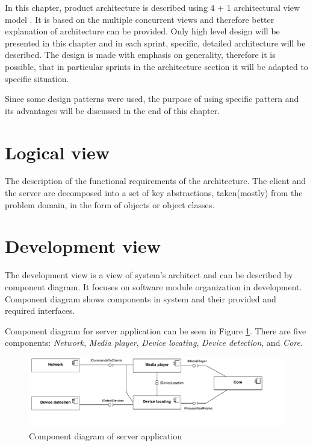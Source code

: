 In this chapter, product architecture is described using 4 + 1 architectural view model \cite{Kruchten:1995:VMA:624610.625529}. It is based on the multiple concurrent views and therefore better explanation of architecture can be provided.
Only high level design will be presented in this chapter and in each sprint, specific, detailed architecture will be described.
The design is made with emphasis on generality, therefore it is possible, that in particular sprints in the architecture section it will be adapted to specific situation.

Since some design patterns were used, the purpose of using specific pattern and its advantages will be discussed in the end of this chapter.

\section{Logical view}
The description of the functional requirements of the architecture. The client and the server are decomposed into a set of key abstractions, taken(mostly) from the problem domain, in the form of objects or object classes.

\section{Development view}
The development view is a view of system's architect and can be described by component diagram.
It focuses on software module organization in development.
Component diagram shows components in system and their provided and required interfaces.

Component diagram for server application can be seen in Figure \ref{fig:component_diagram_server}.
There are five components: \emph{Network}, \emph{Media player},  \emph{Device locating}, \emph{Device detection}, and \emph{Core}.

\begin{figure}[h]
	\centering
		\includegraphics[width=16.2cm]{softwareArchitecture/component_diagram.pdf}
	\caption{Component diagram of server application}
	\label{fig:component_diagram_server}
\end{figure}


